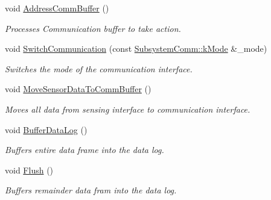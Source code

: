 \begin{DoxyCompactItemize}
\mbox{\label{classosse_1_1collaborate_1_1_node_ae36a2e5d2d098d9708a9884a6210a7f3}} 
void \hyperlink{classosse_1_1collaborate_1_1_node_ae36a2e5d2d098d9708a9884a6210a7f3}{Address\+Comm\+Buffer} ()
\begin{DoxyCompactList}\small\item\em Processes Communication buffer to take action. \end{DoxyCompactList}\item 
void \hyperlink{classosse_1_1collaborate_1_1_node_a45e01ee665774552f165918a13009264}{Switch\+Communication} (const \hyperlink{classosse_1_1collaborate_1_1_subsystem_comm_a5e1ce4f232ca2aae0b99d1225e682190}{Subsystem\+Comm\+::k\+Mode} \&\+\_\+mode)
\begin{DoxyCompactList}\small\item\em Switches the mode of the communication interface. \end{DoxyCompactList}\item 
\mbox{\label{classosse_1_1collaborate_1_1_node_a09b3bb653fbbc822e032ddcb21391578}} 
void \hyperlink{classosse_1_1collaborate_1_1_node_a09b3bb653fbbc822e032ddcb21391578}{Move\+Sensor\+Data\+To\+Comm\+Buffer} ()
\begin{DoxyCompactList}\small\item\em Moves all data from sensing interface to communication interface. \end{DoxyCompactList}\item 
\mbox{\label{classosse_1_1collaborate_1_1_node_ae2d23d2421c57428f2526688dd45617e}} 
void \hyperlink{classosse_1_1collaborate_1_1_node_ae2d23d2421c57428f2526688dd45617e}{Buffer\+Data\+Log} ()
\begin{DoxyCompactList}\small\item\em Buffers entire data frame into the data log. \end{DoxyCompactList}\item 
\mbox{\label{classosse_1_1collaborate_1_1_node_a1b150ab656ccb5432591ae6b487ee4c7}} 
void \hyperlink{classosse_1_1collaborate_1_1_node_a1b150ab656ccb5432591ae6b487ee4c7}{Flush} ()
\begin{DoxyCompactList}\small\item\em Buffers remainder data fram into the data log. \end{DoxyCompactList}\item 

\end{DoxyCompactItemize}
